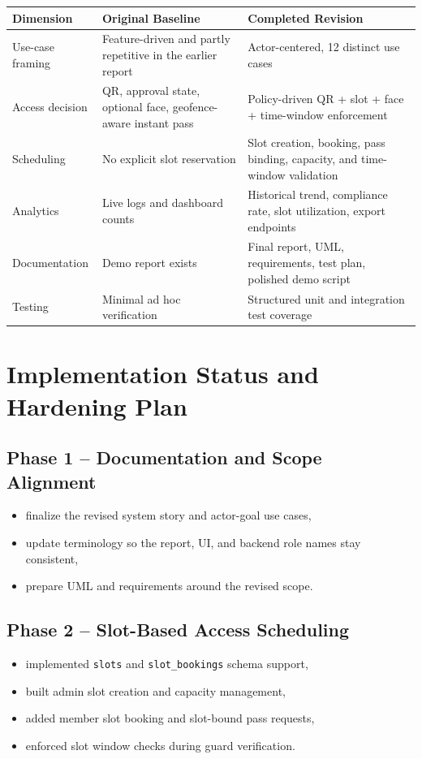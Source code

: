 \documentclass[12pt,letterpaper]{article}
\begin{document}
\begin{tabularx}{\textwidth}{@{}L{3.4cm}Y Y@{}}
\toprule
\textbf{Dimension} & \textbf{Original Baseline} & \textbf{Completed Revision} \\
\midrule
Use-case framing & Feature-driven and partly repetitive in the earlier report & Actor-centered, 12 distinct use cases \\
Access decision & QR, approval state, optional face, geofence-aware instant pass & Policy-driven QR + slot + face + time-window enforcement \\
Scheduling & No explicit slot reservation & Slot creation, booking, pass binding, capacity, and time-window validation \\
Analytics & Live logs and dashboard counts & Historical trend, compliance rate, slot utilization, export endpoints \\
Documentation & Demo report exists & Final report, UML, requirements, test plan, polished demo script \\
Testing & Minimal ad hoc verification & Structured unit and integration test coverage \\
\bottomrule
\end{tabularx}

\section{Implementation Status and Hardening Plan}

\subsection{Phase 1 -- Documentation and Scope Alignment}
\begin{itemize}
    \item finalize the revised system story and actor-goal use cases,
    \item update terminology so the report, UI, and backend role names stay consistent,
    \item prepare UML and requirements around the revised scope.
\end{itemize}

\subsection{Phase 2 -- Slot-Based Access Scheduling}
\begin{itemize}
    \item implemented \texttt{slots} and \texttt{slot\_bookings} schema support,
    \item built admin slot creation and capacity management,
    \item added member slot booking and slot-bound pass requests,
    \item enforced slot window checks during guard verification.
\end{itemize}
\end{document}
